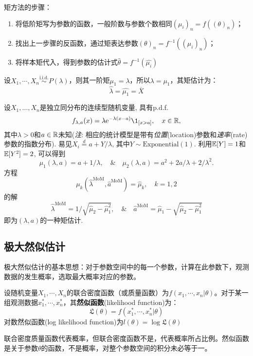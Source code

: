 矩方法的步骤：
\begin{enumerate}
    \item 将低阶矩写为参数的函数，一般阶数与参数个数相同$(\mu_i)_n=f((\theta)_n)$；
    \item 找出上一步骤的反函数，通过矩表达参数$(\theta)_n=f^{-1}((\mu_i)_n)$；
    \item 将样本矩代入，得到参数的估计式$\hat{\theta}=f^{-1}(\hat{\mu_i})$
\end{enumerate}

\begin{example}[泊松分布的矩估计]\label{moment_estimate_Poisson}
    设$X_1, \cdots ,X_n \overset{\text{i.i.d.}}{\sim} P(\lambda)$，则其一阶矩$\mu_1=\lambda$，所以$\lambda=\mu_1$，其矩估计为：
    \[ \hat{\lambda} = \hat{\mu_1} = \overline{X} \]
\end{example}

\begin{example}
    设$X_{1},\dots,X_{n}$是独立同分布的连续型随机变量, 具有p.d.f.
    \[ f_{\lambda,a}(x) = \lambda\mathrm{e}^{-\lambda(x-a)}\1_{[x>a]}, \quad x\in\R, \]
    其中$\lambda > 0$和$a \in \mathbb{R}$未知(\emph{注}: 相应的统计模型是带有\emph{位置}(location)参数和\emph{速率}(rate)参数的指数分布). 易见$X_{i} \stackrel{d}{=} a + Y/\lambda$, 其中$Y \sim \mathrm{Exponential}(1)$. 利用$\mathbb{E}[Y]=1$和$\mathbb{E}[Y^{2}] = 2$, 可以得到
    \[ \mu_{1}(\lambda,a) = a + 1/\lambda, \quad\&\quad
        \mu_{2}(\lambda,a) = a^{2} + 2a/\lambda + 2/\lambda^{2} . \]
    方程
    \[ \mu_{k}(\hat{\lambda}^{\mathrm{MoM}},\hat{a}^{\mathrm{MoM}}) = \hat{\mu}_{k}, \quad k = 1,2 \]
    的解
    \[ \hat{\lambda}^{\mathrm{MoM}} = 1\Big/\sqrt{\hat{\mu}_{2}-\hat{\mu}_{1}^{2}}, \quad\&\quad
        \hat{a}^{\mathrm{MoM}} = \hat{\mu}_{1}-\sqrt{\hat{\mu}_{2}-\hat{\mu}_{1}^{2}} \]
    即为$(\lambda,a)$的一种矩估计.
\end{example}

\begin{proposition}[矩估计的一致性]
    
\end{proposition}

\subsection{极大然似估计}

极大然似估计的基本思想：对于参数空间中的每一个参数，计算在此参数下，观测数据的发生概率，选取最大概率对应的参数。

\begin{definition}[然似函数]
    设随机变量$X_1,\cdots ,X_n$的联合密度函数（或质量函数）为$f(x_1,\cdots ,x_n|\theta)$。对于某一组观测数据$x_1^* ,\cdots ,x_n^*$，其\textbf{然似函数}(likelihood function)为：
    \[ \mathfrak{L}(\theta) = f(x_1^* ,\cdots ,x_n^*|\theta) \]
    对数然似函数(log likelihood function)为$l(\theta)=\log\mathfrak{L}(\theta)$
\end{definition}
\begin{remark}
    联合密度质量函数代表概率，但联合密度函数不是，代表概率所占比例。然似函数是关于参数$\theta$的函数，不是概率，对整个参数空间的积分未必等于一。
\end{remark}

